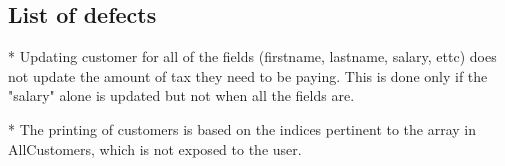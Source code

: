 \subsection{List of defects}



* Updating customer for all of the fields (firstname, lastname, salary, ettc) does not update the amount of tax they need to be paying. This is done only if the "salary" alone is updated but not when all the fields are. 

* The printing of customers is based on the indices pertinent to the array in AllCustomers, which is not exposed to the user. 


